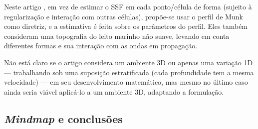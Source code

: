 
Neste artigo \cite{wu_inversion_2023}, em vez de estimar o SSF em cada ponto/célula de forma  (sujeito à regularização e interação com outras células), propõe-se usar o perfil de Munk como diretriz, e a estimativa é feita sobre os parâmetros do perfil. Eles também consideram uma topografia do leito marinho não suave, levando em conta diferentes formas e sua interação com as ondas em propagação.

Não está claro se o artigo considera um ambiente 3D ou apenas uma variação 1D --- trabalhando sob uma suposição estratificada (cada profundidade tem a mesma velocidade) --- em seu desenvolvimento matemático, mas mesmo no último caso ainda seria viável aplicá-lo a um ambiente 3D, adaptando a formulação.

%
%
%



\subsection{\textsl{Mindmap} e conclusões}

